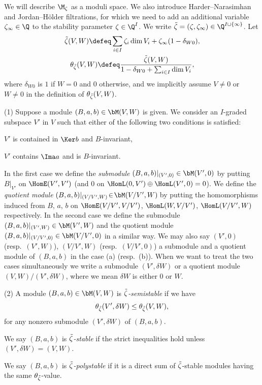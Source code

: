 We will describe $\M_\zeta$ as a moduli space. We also introduce
Harder--Narasimhan and Jordan--H\"older f\/iltrations, for which we need
to add an additional variable $\zeta_\infty\in\Q$ to the stability
parameter $\zeta\in \Q^I$. We write $\Tilde\zeta =
(\zeta,\zeta_\infty) \in \Q^{I\sqcup\{\infty\}}$. Let
\begin{gather*}
 \Tilde\zeta(V,W)
   \defeq \sum_{i\in I} \zeta_{i} \dim V_i
   + \zeta_\infty (1-\delta_{W0}),
\\
 \theta_{\Tilde\zeta}(V,W)
   \defeq
   \frac{\Tilde\zeta(V,W)}{1 - \delta_{W0} + \sum_{i\in I} \dim V_i},
\end{gather*}
where $\delta_{W0}$ is $1$ if $W=0$ and $0$ otherwise, and we
implicitly assume $V\neq 0$ or $W\neq 0$ in the def\/inition of
$\theta_{\Tilde\zeta}(V,W)$.

\begin{Definition}\label{def:stable}
  \textup{(1)} Suppose a module $(B, a, b)\in\bM(V,W)$ is given. We
  consider an $I$-graded subspace $V'$ in $V$ such that either of the
  following two conditions is satisf\/ied:
\begin{aenume}\itemsep=0pt
\item $V'$ is contained in $\Ker b$ and $B$-invariant,
\item $V'$ contains $\Ima a$ and is $B$-invariant.
\end{aenume}
In the f\/irst case we def\/ine the {\it submodule\/} $(B,a,b)|_{(V',0)} \in
\bM(V',0)$ by putting $B|_{V'}$ on $\HomE(V',V')$ (and $0$ on
$\HomL(0,V')\oplus \HomL(V',0) = 0$). We def\/ine the {\it quotient
  module\/} $(B,a,b)|_{(V/V',W)}\!\in\! \bM(V/V',W)\!$ by putting
the homomorphisms induced from $B$, $a$, $b$ on
$\HomE(V/V',V/V')$, $\HomL(W,V/V')$, $\HomL(V/V',W)$ respectively.
%
In the second case we def\/ine the submodule
$(B,a,b)|_{(V',W)}\in \bM(V',W)$ and the quotient module
$(B,a,b)|_{(V/V',0)}\in \bM(V/V',0)$ in a similar way.
%
We may also say $(V',0)$ \textup(resp.\ $(V',W)$\textup), $(V/V',W)$
\textup(resp.\ $(V/V',0)$\textup) a submodule and a quotient module
of $(B,a,b)$ in the case (a) \textup(resp.\ (b)\textup).
%
When we want to treat the two cases simultaneously we write
a submodule $(V',\delta W)$ or a quotient module $(V, W)/(V',\delta W)$,
where we mean $\delta W$ is either $0$ or $W$.

\textup{(2)} A module $(B, a, b)\in\bM(V,W)$ is {\it
$\Tilde\zeta$-semistable\/} if we have
\begin{equation}\label{eq:slope}
   \theta_{\Tilde\zeta}(V',\delta W) \le \theta_{\Tilde\zeta}(V,W),
\end{equation}
for any nonzero submodule $(V',\delta W)$ of $(B,a,b)$.

We say $(B,a,b)$ is {\it $\Tilde\zeta$-stable\/} if the strict
inequalities hold unless $(V',\delta W) = (V,W)$.


We say $(B,a,b)$ is {\it $\Tilde\zeta$-polystable\/} if it is a
direct sum of $\Tilde\zeta$-stable modules having the same
$\theta_{\Tilde\zeta}$-value.
\end{Definition}

